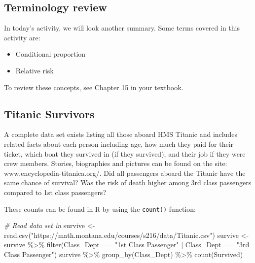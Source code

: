 \documentclass[
]{report}
\newenvironment{Shaded}{\begin{snugshade}}{\end{snugshade}}
\newcommand{\CommentTok}[1]{\textcolor[rgb]{0.56,0.35,0.01}{\textit{#1}}}
\newcommand{\FunctionTok}[1]{\textcolor[rgb]{0.00,0.00,0.00}{#1}}
\newcommand{\NormalTok}[1]{#1}
\newcommand{\OtherTok}[1]{\textcolor[rgb]{0.56,0.35,0.01}{#1}}
\newcommand{\SpecialCharTok}[1]{\textcolor[rgb]{0.00,0.00,0.00}{#1}}
\newcommand{\StringTok}[1]{\textcolor[rgb]{0.31,0.60,0.02}{#1}}
\begin{document}
\hypertarget{terminology-review-8}{%
\subsection{Terminology review}\label{terminology-review-8}}

In today's activity, we will look another summary. Some terms covered in this activity are:

\begin{itemize}
\item
  Conditional proportion
\item
  Relative risk
\end{itemize}

To review these concepts, see Chapter 15 in your textbook.

\hypertarget{titanic-survivors}{%
\subsection{Titanic Survivors}\label{titanic-survivors}}

A complete data set exists listing all those aboard HMS Titanic and includes related facts about each person including age, how much they paid for their ticket, which boat they survived in (if they survived), and their job if they were crew members. Stories, biographies and pictures can be found on the site: www.encyclopedia-titanica.org/. Did all passengers aboard the Titanic have the same chance of survival? Was the risk of death higher among 3rd class passengers compared to 1st class passengers?

These counts can be found in R by using the \texttt{count()} function:

\begin{Shaded}
\begin{Highlighting}[]
\CommentTok{\# Read data set in}
\NormalTok{survive }\OtherTok{\textless{}{-}} \FunctionTok{read.csv}\NormalTok{(}\StringTok{"https://math.montana.edu/courses/s216/data/Titanic.csv"}\NormalTok{)}
\NormalTok{survive }\OtherTok{\textless{}{-}}\NormalTok{ survive }\SpecialCharTok{\%\textgreater{}\%}
  \FunctionTok{filter}\NormalTok{(Class\_Dept }\SpecialCharTok{==} \StringTok{"1st Class Passenger"} \SpecialCharTok{|}\NormalTok{ Class\_Dept }\SpecialCharTok{==} \StringTok{"3rd Class Passenger"}\NormalTok{)}
\NormalTok{survive }\SpecialCharTok{\%\textgreater{}\%} \FunctionTok{group\_by}\NormalTok{(Class\_Dept) }\SpecialCharTok{\%\textgreater{}\%} \FunctionTok{count}\NormalTok{(Survived)}
\end{Highlighting}
\end{Shaded}
\end{document}
